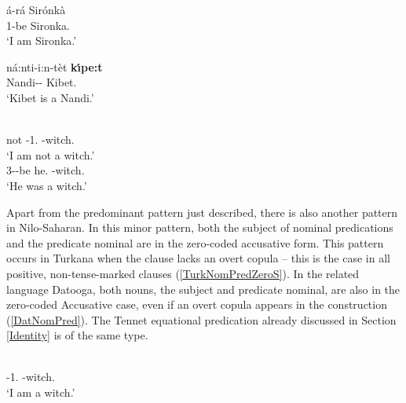 \begin{exe}\ex \label{MaaNomPred}
\gll \'a-r\'a Sir\'onk\`a\\
			1\sg{}-be Sironka.\acc{}\\
\glt `I am Sironka.' 
\end{exe}

\begin{exe}\ex\label{NanNomPred}
\gll n\'a:nti-i:n-t\`et \textbf{k\'\i pe:t}\\
Nandi-\sg{}-\them{} Kibet.\nom{}\\
\glt `Kibet is a Nandi.'
\end{exe}

\begin{exe}\ex\label{TurNomPred}
\begin{xlist}\ex\gll{}  \\
not \NC{}-1\sg{}.\nom{} \NC{}-witch.\acc{}\\
\glt `I am not a witch.'
\ex\gll {}  \\
3-\pst{}-be he.\nom{} \NC{}-witch.\acc{}\\
\glt `He was a witch.'
\end{xlist}
\end{exe}

Apart from the predominant pattern just described, there is also another pattern in Nilo-Saharan. 
In this minor pattern, both the subject of nominal predications and the predicate nominal are in the zero-coded accusative form. 
This pattern occurs in Turkana when the clause lacks an overt copula -- this is the case in all positive, non-tense-marked clauses (\ref{TurkNomPredZeroS}). 
In the related language Datooga, both nouns, the subject and predicate nominal, are also in the zero-coded Accusative case, even if an overt copula appears in the construction (\ref{DatNomPred}). 
The Tennet equational predication already discussed in Section \ref{Identity} is of the same type. 

\begin{exe}\ex\label{TurkNomPredZeroS}
\gll{} \\
\NC{}-1\sg{}.\acc{} \NC{}-witch.\acc{}\\
\glt `I am a witch.'\end{exe}


